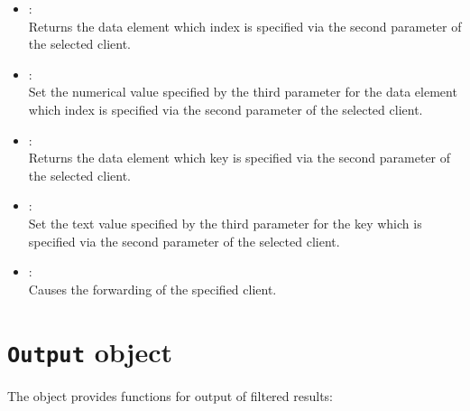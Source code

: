 \begin{itemize}
\item
{}:\\
Returns the data element which index is specified via the second parameter of the selected client.

\item
{}:\\
Set the numerical value specified by the third parameter for the data element which index is specified via the second parameter of the selected client.

\item
{}:\\
Returns the data element which key is specified via the second parameter of the selected client.

\item
{}:\\
Set the text value specified by the third parameter for the key which is specified via the second parameter of the selected client.

\item
{}:\\
Causes the forwarding of the specified client.
	
\end{itemize}



\chapter{\texttt{Output} object}

The  object provides functions for output of filtered results:


